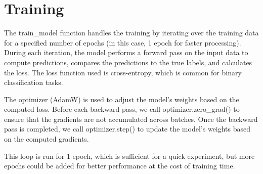 \documentclass[11pt]{article}
\begin{document}
    \section{Training}\label{training}

    The train\_model function handles the training by iterating over the
training data for a specified number of epochs (in this case, 1 epoch
for faster processing). During each iteration, the model performs a
forward pass on the input data to compute predictions, compares the
predictions to the true labels, and calculates the loss. The loss
function used is cross-entropy, which is common for binary
classification tasks.

The optimizer (AdamW) is used to adjust the model's weights based on the
computed loss. Before each backward pass, we call optimizer.zero\_grad()
to ensure that the gradients are not accumulated across batches. Once
the backward pass is completed, we call optimizer.step() to update the
model's weights based on the computed gradients.

This loop is run for 1 epoch, which is sufficient for a quick
experiment, but more epochs could be added for better performance at the
cost of training time.
\end{document}

